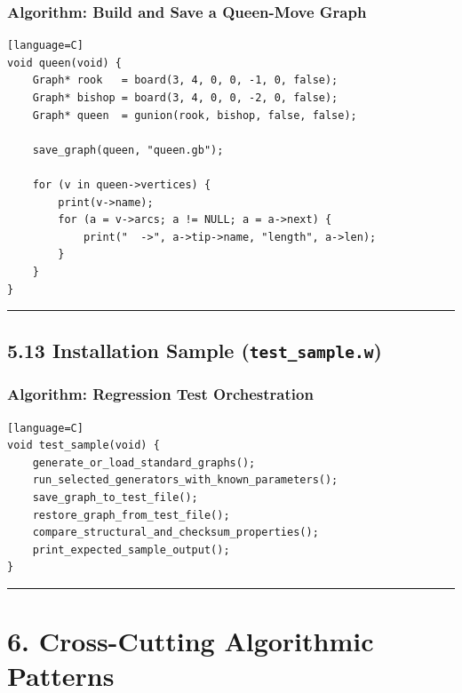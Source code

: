 \documentclass[11pt]{article}
\begin{document}
\subsubsection{Algorithm: Build and Save a Queen-Move Graph}\label{algorithm-build-and-save-a-queen-move-graph}

\begin{verbatim}[language=C]
void queen(void) {
    Graph* rook   = board(3, 4, 0, 0, -1, 0, false);
    Graph* bishop = board(3, 4, 0, 0, -2, 0, false);
    Graph* queen  = gunion(rook, bishop, false, false);

    save_graph(queen, "queen.gb");

    for (v in queen->vertices) {
        print(v->name);
        for (a = v->arcs; a != NULL; a = a->next) {
            print("  ->", a->tip->name, "length", a->len);
        }
    }
}
\end{verbatim}

\begin{center}\rule{0.5\linewidth}{0.5pt}\end{center}

\subsection{\texorpdfstring{5.13 Installation Sample (\texttt{test\_sample.w})}{5.13 Installation Sample (test\_sample.w)}}\label{installation-sample-test_sample.w}

\subsubsection{Algorithm: Regression Test Orchestration}\label{algorithm-regression-test-orchestration}

\begin{verbatim}[language=C]
void test_sample(void) {
    generate_or_load_standard_graphs();
    run_selected_generators_with_known_parameters();
    save_graph_to_test_file();
    restore_graph_from_test_file();
    compare_structural_and_checksum_properties();
    print_expected_sample_output();
}
\end{verbatim}

\begin{center}\rule{0.5\linewidth}{0.5pt}\end{center}

\section{6. Cross-Cutting Algorithmic Patterns}\label{cross-cutting-algorithmic-patterns}
\end{document}
